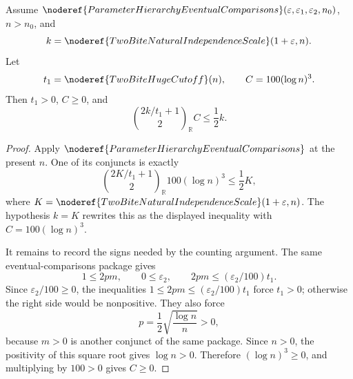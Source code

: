 \begin{helper}
Assume
\(\noderef{ParameterHierarchyEventualComparisons}
(\varepsilon,\varepsilon_1,\varepsilon_2,n_0)\), \(n>n_0\), and
\[
k=\noderef{TwoBiteNaturalIndependenceScale}(1+\varepsilon,n).
\]
Let
\[
t_1=\noderef{TwoBiteHugeCutoff}(n),\qquad C=100(\log n)^3.
\]
Then \(t_1>0\), \(C\ge0\), and
\[
\binom{2k/t_1+1}{2}_{\mathbb R}C\le \frac12 k.
\]
\end{helper}
\begin{proof}
Apply \(\noderef{ParameterHierarchyEventualComparisons}\) at the present
\(n\).  One of its conjuncts is exactly
\[
\binom{2K/t_1+1}{2}_{\mathbb R}100(\log n)^3\le\frac12K,
\]
where \(K=\noderef{TwoBiteNaturalIndependenceScale}(1+\varepsilon,n)\).
The hypothesis \(k=K\) rewrites this as the displayed inequality with
\(C=100(\log n)^3\).

It remains to record the signs needed by the counting argument.  The same
eventual-comparisons package gives
\[
1\le 2pm,\qquad 0\le\varepsilon_2,\qquad
2pm\le(\varepsilon_2/100)t_1.
\]
Since \(\varepsilon_2/100\ge0\), the inequalities
\(1\le 2pm\le(\varepsilon_2/100)t_1\) force \(t_1>0\); otherwise the right
side would be nonpositive.  They also force
\[
p=\frac12\sqrt{\frac{\log n}{n}}>0,
\]
because \(m>0\) is another conjunct of the same package.  Since \(n>0\), the
positivity of this square root gives \(\log n>0\).  Therefore
\((\log n)^3\ge0\), and multiplying by \(100>0\) gives \(C\ge0\).
\end{proof}
